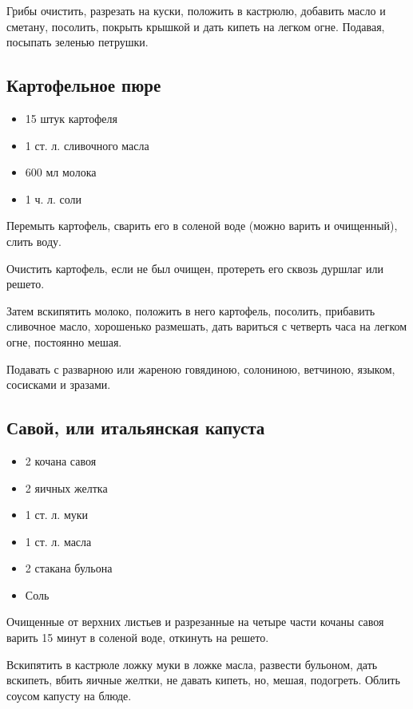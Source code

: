Грибы очистить, разрезать на куски, положить в кастрюлю, добавить масло и сметану, посолить, покрыть крышкой и дать кипеть на легком огне. Подавая, посыпать зеленью петрушки.

\subsection{Картофельное пюре}

\begin{itemize}
	\item 15 штук картофеля 
    \item 1 ст. л. сливочного масла 
    \item 600 мл молока 
    \item 1 ч. л. соли
\end{itemize}

Перемыть картофель, сварить его в соленой воде (можно варить и очищенный), слить воду.

Очистить картофель, если не был очищен, протереть его сквозь дуршлаг или решето.

Затем вскипятить молоко, положить в него картофель, посолить, прибавить сливочное масло, хорошенько размешать, дать вариться с четверть часа на легком огне, постоянно мешая.

Подавать с разварною или жареною говядиною, солониною, ветчиною, языком, сосисками и зразами.

\subsection{Савой, или итальянская капуста}

\begin{itemize}
	\item 2 кочана савоя 
    \item 2 яичных желтка 
    \item 1 ст. л. муки 
    \item 1 ст. л. масла 
    \item 2 стакана бульона 
    \item Соль
\end{itemize}

Очищенные от верхних листьев и разрезанные на четыре части кочаны савоя варить 15 минут в соленой воде, откинуть на решето.

Вскипятить в кастрюле ложку муки в ложке масла, развести бульоном, дать вскипеть, вбить яичные желтки, не давать кипеть, но, мешая, подогреть. Облить соусом капусту на блюде.

